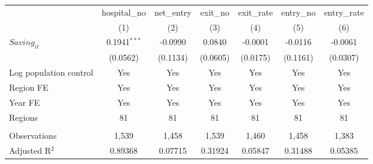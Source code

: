 \begingroup
\centering
\begin{tabular}{lcccccc}
   \toprule
                          & hospital\_no   & net\_entry  & exit\_no  & exit\_rate  & entry\_no  & entry\_rate \\    
                          & (1)            & (2)         & (3)       & (4)         & (5)        & (6)\\  
   \midrule 
   $Saving_{it}$          & 0.1941$^{***}$ & -0.0990     & 0.0840    & -0.0001     & -0.0116    & -0.0061\\   
                          & (0.0562)       & (0.1134)    & (0.0605)  & (0.0175)    & (0.1161)   & (0.0307)\\   
   Log population control & Yes            & Yes         & Yes       & Yes         & Yes        & Yes\\  
   Region FE              & Yes            & Yes         & Yes       & Yes         & Yes        & Yes\\  
   Year FE                & Yes            & Yes         & Yes       & Yes         & Yes        & Yes\\  
   Regions                & 81             & 81          & 81        & 81          & 81         & 81\\  
    \\
   Observations           & 1,539          & 1,458       & 1,539     & 1,460       & 1,458      & 1,383\\  
   Adjusted R$^2$         & 0.89368        & 0.07715     & 0.31924   & 0.05847     & 0.31488    & 0.05385\\  
   \bottomrule
\end{tabular}
\par\endgroup
